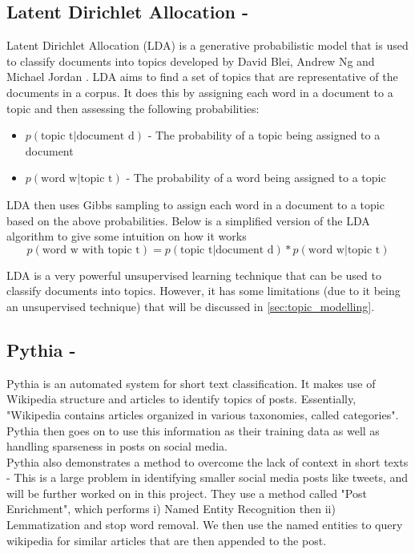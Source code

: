 \subsection{Latent Dirichlet Allocation - \cite{lda}}
Latent Dirichlet Allocation (LDA) is a generative probabilistic model that is used to classify documents into topics developed
by David Blei, Andrew Ng and Michael Jordan \cite{lda}. LDA aims to find a set of topics that are representative of the documents
in a corpus. It does this by assigning each word in a document to a topic and then assessing the following probabilities:
\begin{itemize}
    \item $p(\text{topic t} \vert \text{document d})$ - The probability of a topic being assigned to a document
    \item $p(\text{word w} \vert \text{topic t})$ - The probability of a word being assigned to a topic
\end{itemize}

LDA then uses Gibbs sampling to assign each word in a document to a topic based on the above probabilities. Below is a
simplified version of the LDA algorithm to give some intuition on how it works
\begin{equation}
    p(\text{word w with topic t}) = p(\text{topic t} \vert \text{document d}) * p(\text{word w} \vert \text{topic t})
\end{equation}

LDA is a very powerful unsupervised learning technique that can be used to classify documents into topics. However,
it has some limitations (due to it being an unsupervised technique) that will be discussed in \cref{sec:topic_modelling}.
\subsection{Pythia - \cite{Pythia}}
\label{sec:pythia}
Pythia is an automated system for short text classification. It makes use of Wikipedia structure and articles to identify
topics of posts.
Essentially, "Wikipedia contains articles organized in various taxonomies, called categories". Pythia then goes on to use
this information as their training data as well as handling sparseness in posts on social media.\\

Pythia also demonstrates a method to overcome the lack of context in short texts - This is a large problem in identifying
smaller social media posts like tweets, and will be further worked on in this project. They use a method called "Post Enrichment",
which performs i) Named Entity Recognition then ii) Lemmatization and stop word removal. We then use the named entities to query
wikipedia for similar articles that are then appended to the post.\\

